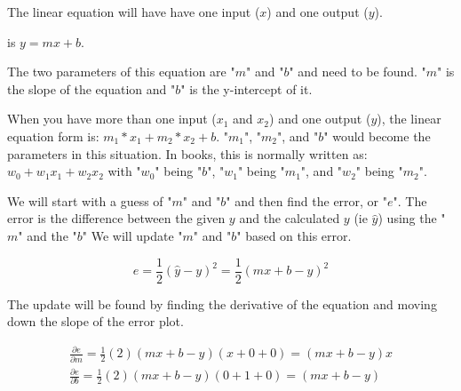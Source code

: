 \documentclass{article}
\begin{document}
The linear equation will have have one input ($x$) and one output ($y$).

is $y = mx + b$. 

The two parameters of this equation are "$m$" and "$b$" and need to be found.
"$m$" is the slope of the equation and "$b$" is the y-intercept of it.

When you have more than one input ($x_1$ and $x_2$) and one output ($y$), the linear equation form is: $m_1 * x_1 + m_2 *x_2 + b$.
"$m_1$", "$m_2$", and "$b$" would become the parameters in this situation.
In books, this is normally written as: $w_0 + w_1x_1 + w_2x_2$ with "$w_0$" being "$b$", "$w_1$" being "$m_1$", and "$w_2$" being "$m_2$".

We will start with a guess of "$m$" and "$b$" and then find the error, or "$e$". The error is the difference between the given $y$ and the calculated $y$ (ie $\hat{y}$) using the "$m$" and the "$b$"
We will update "$m$" and "$b$" based on this error.

\begin{equation}
    e = \frac{1}{2}(\hat{y}-y)^2 = \frac{1}{2}(mx+b-y)^2
    \label{eqn:error}
\end{equation}

The update will be found by finding the derivative of the equation and moving down the slope of the error plot.

\begin{equation}
\begin{array}{cc}
    \frac{\partial e}{\partial m} = \frac{1}{2}(2)(mx+b-y)(x+0+0) = (mx+b-y)x
    \\
    \frac{\partial e}{\partial b} = \frac{1}{2}(2)(mx+b-y)(0+1+0)=(mx+b-y)
    \label{eqn:Gradientdescent}
\end{array}
\end{equation}
\end{document}
